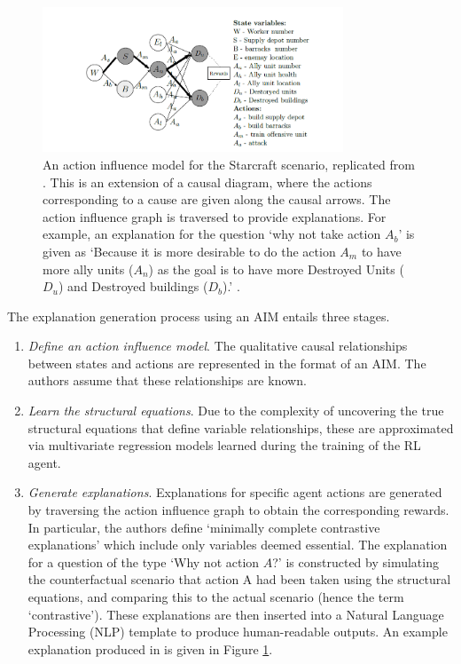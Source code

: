 \documentclass{article}
\begin{document}
\begin{figure}[htp]
    \centering
    \includegraphics[width=0.8\textwidth]{Images/Action influence.png}
    \caption{An action influence model for the Starcraft scenario, replicated from \cite{madumal2020explainable}. This is an extension of a causal diagram, where the actions corresponding to a cause are given along the causal arrows. The action influence graph is traversed to provide explanations. For example, an explanation for the question `why not take action $A_b$' is given as `Because it is more desirable to do the action $A_m$ to have more ally units ($A_n$) as the goal is to have more Destroyed Units ($D_u$) and Destroyed buildings ($D_b$).' \cite{madumal2020explainable}.
    }
    \label{fig:action-influence}
\end{figure}


\noindent The explanation generation process using an AIM entails three stages.

\begin{enumerate}
    \item \textit{Define an action influence model}.  The qualitative causal relationships between states and actions are represented in the format of an AIM. The authors assume that these relationships are known.
    \item \textit{Learn the structural equations}. Due to the complexity of uncovering the true structural equations that define variable relationships, these are approximated via multivariate regression models learned during the training of the RL agent.
    \item \textit{Generate explanations}. Explanations for specific agent actions are generated by traversing the action influence graph to obtain the corresponding rewards. In particular, the authors define `minimally complete contrastive explanations' which include only variables deemed essential. The explanation for a question of the type `Why not action $A$?' is constructed by simulating the counterfactual scenario that action A had been taken using the structural equations, and comparing this to the actual scenario (hence the term `contrastive'). These explanations are then inserted into a Natural Language Processing (NLP) template to produce human-readable outputs. An example explanation produced in \cite{madumal2020distal} is given in Figure \ref{fig:action-influence}.
\end{enumerate}
\end{document}
